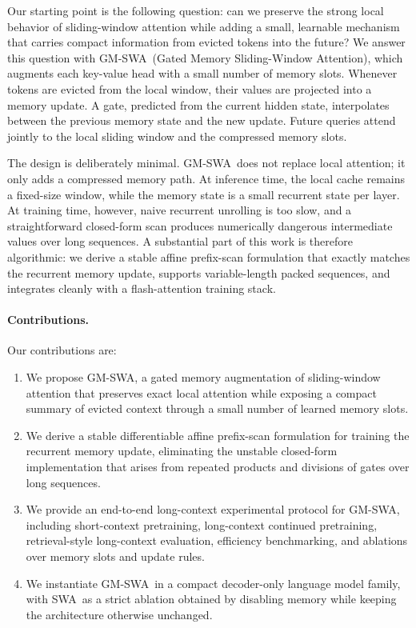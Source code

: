 \documentclass{article}
\newcommand{\model}{GM-SWA}
\newcommand{\baseline}{SWA}
\begin{document}
Our starting point is the following question: can we preserve the strong local behavior of sliding-window attention while adding a small, learnable mechanism that carries compact information from evicted tokens into the future? We answer this question with \model\ (Gated Memory Sliding-Window Attention), which augments each key-value head with a small number of memory slots. Whenever tokens are evicted from the local window, their values are projected into a memory update. A gate, predicted from the current hidden state, interpolates between the previous memory state and the new update. Future queries attend jointly to the local sliding window and the compressed memory slots.

The design is deliberately minimal. \model\ does not replace local attention; it only adds a compressed memory path. At inference time, the local cache remains a fixed-size window, while the memory state is a small recurrent state per layer. At training time, however, naive recurrent unrolling is too slow, and a straightforward closed-form scan produces numerically dangerous intermediate values over long sequences. A substantial part of this work is therefore algorithmic: we derive a stable affine prefix-scan formulation that exactly matches the recurrent memory update, supports variable-length packed sequences, and integrates cleanly with a flash-attention training stack.

\paragraph{Contributions.}
Our contributions are:
\begin{enumerate}
    \item We propose \model, a gated memory augmentation of sliding-window attention that preserves exact local attention while exposing a compact summary of evicted context through a small number of learned memory slots.
    \item We derive a stable differentiable affine prefix-scan formulation for training the recurrent memory update, eliminating the unstable closed-form implementation that arises from repeated products and divisions of gates over long sequences.
    \item We provide an end-to-end long-context experimental protocol for \model, including short-context pretraining, long-context continued pretraining, retrieval-style long-context evaluation, efficiency benchmarking, and ablations over memory slots and update rules.
    \item We instantiate \model\ in a compact decoder-only language model family, with \baseline\ as a strict ablation obtained by disabling memory while keeping the architecture otherwise unchanged.
\end{enumerate}
\end{document}
